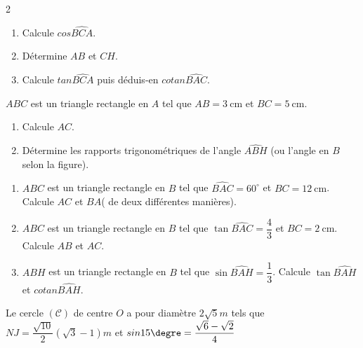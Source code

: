 \begin{multicols*}{2}
  	\begin{enumerate}
  		\item Calcule $cos\widehat{BCA}$.
  		\item Détermine $AB$ et $CH$.
  		\item  Calcule $tan\widehat{BCA}$ puis déduis-en $cotan\widehat{BAC}$. 
  	\end{enumerate} 
  	\begin{center}
  	\end{center}
  	
  	$ABC$ est un triangle rectangle en $A$ tel que $AB = 3\ \mathrm{cm}$ et $BC = 5\ \mathrm{cm}$.
  	\begin{enumerate}
  		\item Calcule $AC$.
  		\item Détermine les rapports trigonométriques de l'angle $\widehat{ABH}$ (ou l'angle en $B$ selon la figure).
  	\end{enumerate}
  	\begin{center}
  	\end{center}
  	
  	\begin{enumerate}
  		\item $ABC$ est un triangle rectangle en $B$ tel que $\widehat{BAC} = 60^\circ$ et $BC = 12\ \mathrm{cm}$. Calcule $AC$ et $ BA $( de deux différentes manières).
  		\item $ABC$ est un triangle rectangle en $B$ tel que $\tan\widehat{BAC} = \dfrac{4}{3}$ et $BC = 2\ \mathrm{cm}$. Calcule $AB$ et $AC$.
  		\item $ABH$ est un triangle rectangle en $B$ tel que $\sin\widehat{BAH} = \dfrac{1}{3}$. Calcule $\tan\widehat{BAH}$ et $cotan\widehat{BAH}$.
  	\end{enumerate}
  	\begin{center}
  	\end{center}
  	\hspace{0.4cm} Le cercle $\mathcal{(C)}$ de centre $O$ a pour diamètre $2\sqrt{5} m$ tels que    $NJ=\dfrac{\sqrt{10}}{2} \left(\sqrt{3}-1 \right )m $ et $sin15\textrm{\degre}=\dfrac{\sqrt{6}-\sqrt{2}}{4}$
  	

\end{multicols*}
